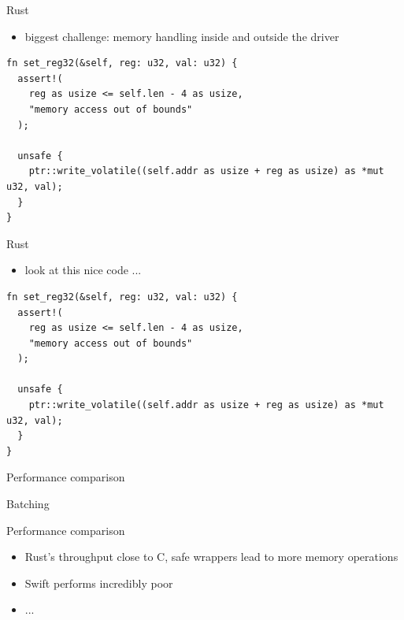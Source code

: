 \documentclass[NET,english,aspectratio=169,notitleframe]{tumbeamer}
\begin{document}
\begin{frame}[fragile]{Rust}
\begin{itemize}
\item biggest challenge: memory handling inside and outside the driver
\end{itemize}
\begin{verbatim}
fn set_reg32(&self, reg: u32, val: u32) {
  assert!(
    reg as usize <= self.len - 4 as usize,
    "memory access out of bounds"
  );

  unsafe {
    ptr::write_volatile((self.addr as usize + reg as usize) as *mut u32, val);
  }
}
\end{verbatim}
\end{frame}

\begin{frame}[fragile]{Rust}
\begin{itemize}
\item look at this nice code ...
\end{itemize}
\begin{verbatim}
fn set_reg32(&self, reg: u32, val: u32) {
  assert!(
    reg as usize <= self.len - 4 as usize,
    "memory access out of bounds"
  );

  unsafe {
    ptr::write_volatile((self.addr as usize + reg as usize) as *mut u32, val);
  }
}
\end{verbatim}
\end{frame}

\begin{frame}{Performance comparison}
\centering
\end{frame}

\begin{frame}{Batching}
\centering
\end{frame}

\begin{frame}{Performance comparison}
\begin{itemize}
\item Rust's throughput close to C, safe wrappers lead to more memory operations
\item Swift performs incredibly poor
\item ...
\end{itemize}
\end{frame}
\end{document}
